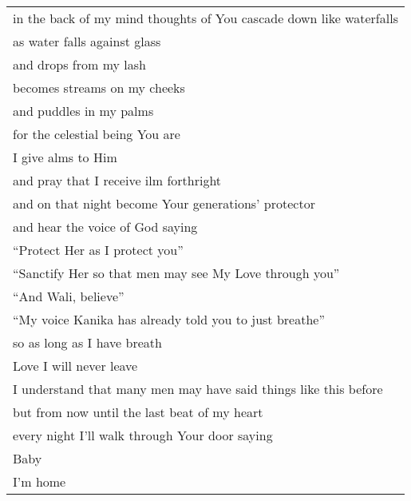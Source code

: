 \section*{\-\ \hspace*{\fill}  \thepage}
\vspace*{1cm}
\begin{center}
\begin{tabular}{l}
in the back of my mind thoughts of You cascade down like waterfalls\\
as water falls against glass\\
and drops from my lash\\
becomes streams on my cheeks\\
and puddles in my palms\\
for the celestial being You are\\
\hspace{9mm} I give alms to Him\\
and pray that I receive ilm forthright\\
and on that night become Your generations’ protector\\
and hear the voice of God saying\\
“Protect Her as I protect you”\\
\hspace{9mm} “Sanctify Her so that men may see My Love through you”\\
\hspace{9mm} “And Wali, believe”\\
\hspace{9mm} “My voice Kanika has already told you to just breathe”\\
so as long as I have breath\\
\hspace{9mm} Love I will never leave\\
I understand that many men may have said things like this before\\
but from now until the last beat of my heart\\
every night I’ll walk through Your door saying\\
\hspace{9mm} Baby\\
\hspace{18mm} I’m home
\end{tabular}
\end{center}
